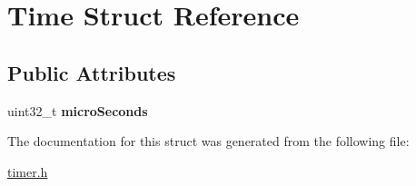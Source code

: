 \hypertarget{structTime}{}\section{Time Struct Reference}
\label{structTime}
\subsection*{Public Attributes}
\begin{DoxyCompactItemize}
\item 
\mbox{\label{structTime_aad746065c17bb222dc72c4112828a8f6}} 
uint32\+\_\+t {\bfseries micro\+Seconds}
\end{DoxyCompactItemize}


The documentation for this struct was generated from the following file\+:\begin{DoxyCompactItemize}
\item 
\hyperlink{timer_8h}{timer.\+h}\end{DoxyCompactItemize}
